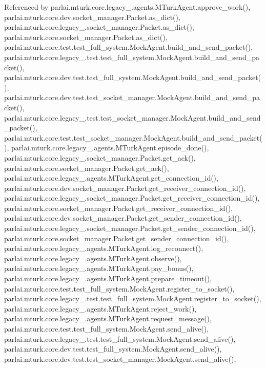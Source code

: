 Referenced by parlai.\+mturk.\+core.\+legacy\+\_.\+agents.\+M\+Turk\+Agent.\+approve\+\_\+work(), parlai.\+mturk.\+core.\+dev.\+socket\+\_\+manager.\+Packet.\+as\+\_\+dict(), parlai.\+mturk.\+core.\+legacy\+\_.\+socket\+\_\+manager.\+Packet.\+as\+\_\+dict(), parlai.\+mturk.\+core.\+socket\+\_\+manager.\+Packet.\+as\+\_\+dict(), parlai.\+mturk.\+core.\+test.\+test\+\_\+full\+\_\+system.\+Mock\+Agent.\+build\+\_\+and\+\_\+send\+\_\+packet(), parlai.\+mturk.\+core.\+legacy\+\_.\+test.\+test\+\_\+full\+\_\+system.\+Mock\+Agent.\+build\+\_\+and\+\_\+send\+\_\+packet(), parlai.\+mturk.\+core.\+dev.\+test.\+test\+\_\+full\+\_\+system.\+Mock\+Agent.\+build\+\_\+and\+\_\+send\+\_\+packet(), parlai.\+mturk.\+core.\+dev.\+test.\+test\+\_\+socket\+\_\+manager.\+Mock\+Agent.\+build\+\_\+and\+\_\+send\+\_\+packet(), parlai.\+mturk.\+core.\+legacy\+\_.\+test.\+test\+\_\+socket\+\_\+manager.\+Mock\+Agent.\+build\+\_\+and\+\_\+send\+\_\+packet(), parlai.\+mturk.\+core.\+test.\+test\+\_\+socket\+\_\+manager.\+Mock\+Agent.\+build\+\_\+and\+\_\+send\+\_\+packet(), parlai.\+mturk.\+core.\+legacy\+\_.\+agents.\+M\+Turk\+Agent.\+episode\+\_\+done(), parlai.\+mturk.\+core.\+legacy\+\_.\+socket\+\_\+manager.\+Packet.\+get\+\_\+ack(), parlai.\+mturk.\+core.\+socket\+\_\+manager.\+Packet.\+get\+\_\+ack(), parlai.\+mturk.\+core.\+legacy\+\_.\+agents.\+M\+Turk\+Agent.\+get\+\_\+connection\+\_\+id(), parlai.\+mturk.\+core.\+dev.\+socket\+\_\+manager.\+Packet.\+get\+\_\+receiver\+\_\+connection\+\_\+id(), parlai.\+mturk.\+core.\+legacy\+\_.\+socket\+\_\+manager.\+Packet.\+get\+\_\+receiver\+\_\+connection\+\_\+id(), parlai.\+mturk.\+core.\+socket\+\_\+manager.\+Packet.\+get\+\_\+receiver\+\_\+connection\+\_\+id(), parlai.\+mturk.\+core.\+dev.\+socket\+\_\+manager.\+Packet.\+get\+\_\+sender\+\_\+connection\+\_\+id(), parlai.\+mturk.\+core.\+legacy\+\_.\+socket\+\_\+manager.\+Packet.\+get\+\_\+sender\+\_\+connection\+\_\+id(), parlai.\+mturk.\+core.\+socket\+\_\+manager.\+Packet.\+get\+\_\+sender\+\_\+connection\+\_\+id(), parlai.\+mturk.\+core.\+legacy\+\_.\+agents.\+M\+Turk\+Agent.\+log\+\_\+reconnect(), parlai.\+mturk.\+core.\+legacy\+\_.\+agents.\+M\+Turk\+Agent.\+observe(), parlai.\+mturk.\+core.\+legacy\+\_.\+agents.\+M\+Turk\+Agent.\+pay\+\_\+bonus(), parlai.\+mturk.\+core.\+legacy\+\_.\+agents.\+M\+Turk\+Agent.\+prepare\+\_\+timeout(), parlai.\+mturk.\+core.\+test.\+test\+\_\+full\+\_\+system.\+Mock\+Agent.\+register\+\_\+to\+\_\+socket(), parlai.\+mturk.\+core.\+legacy\+\_.\+test.\+test\+\_\+full\+\_\+system.\+Mock\+Agent.\+register\+\_\+to\+\_\+socket(), parlai.\+mturk.\+core.\+legacy\+\_.\+agents.\+M\+Turk\+Agent.\+reject\+\_\+work(), parlai.\+mturk.\+core.\+legacy\+\_.\+agents.\+M\+Turk\+Agent.\+request\+\_\+message(), parlai.\+mturk.\+core.\+test.\+test\+\_\+full\+\_\+system.\+Mock\+Agent.\+send\+\_\+alive(), parlai.\+mturk.\+core.\+legacy\+\_.\+test.\+test\+\_\+full\+\_\+system.\+Mock\+Agent.\+send\+\_\+alive(), parlai.\+mturk.\+core.\+dev.\+test.\+test\+\_\+full\+\_\+system.\+Mock\+Agent.\+send\+\_\+alive(), parlai.\+mturk.\+core.\+dev.\+test.\+test\+\_\+socket\+\_\+manager.\+Mock\+Agent.\+send\+\_\+alive(), 